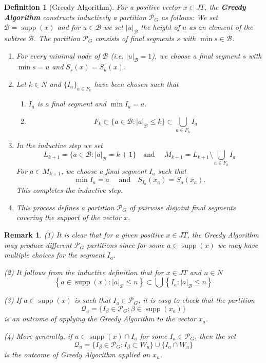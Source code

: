 \documentclass[11pt,a4paper]{amsart}
\newtheorem{definition}[theorem]{Definition}
\newtheorem{remark}[theorem]{Remark}
\newcommand{\JT}{JT}
\newcommand{\supp}{\operatorname{supp}}
\newcommand{\N}{N}
\begin{document}
\begin{definition}[Greedy Algorithm]
    For a positive vector $x \in \JT$, the \textbf{Greedy Algorithm} constructs inductively a partition $\mathcal{P}_G$ as follows:
    We set $\mathcal{B} = \supp(x)$ and for $u \in \mathcal{B}$ we set $|u|_\mathcal{B}$ the height of $u$ as an element of the subtree $\mathcal{B}$. The partition $\mathcal{P}_G$ consists of final segments $s$ with $\min s \in \mathcal{B}$.
    
    
    \begin{enumerate}
        \item For every minimal node of $\mathcal{B}$ (i.e. $|u|_\mathcal{B}= 1 $), we choose a final segment $s$ with 
        $\min s = u $ and $S_s(x) = S_u(x)$.
        \item Let $k\in \N$ and  $\{ I_a \}_{a\in F_k}$  have been chosen such that 
        \begin{enumerate}
        \item  $I_a $ is a final segment and $\min I_a = a $.
        \item 
        \[ F_k \subset \{ a\in \mathcal{B} : |a|_\mathcal{B} \le k \} \subset \bigcup_{a \in F_k } I_a \]
        \end{enumerate}
      \item In the inductive step we set
       \[ L_{k+1}= \{ a\in \mathcal{B}: |a|_\mathcal{B} = k+1 \} \quad \text{and } \quad M_{k+1} = L_{k+1} \setminus
       \bigcup_{a\in F_k} I_a  \]
       For $a \in M_{k+1} $, we choose a final segment $I_a$ such that
        \[ \min I_a = a \quad \text{ and} \quad S_{I_a}(x_a) = S_a(x_a). \]
       This completes the inductive step.
        \item This process defines a partition $\mathcal{P}_G$ of pairwise disjoint final segments covering the support of the vector $x$.
    \end{enumerate}
\end{definition}
\begin{remark} \label{R5.6}(1) It is clear that for a given  positive $x\in \JT$, the Greedy Algorithm may produce different $\mathcal{P}_G$ partitions since for some $a \in \supp(x)$ we may have multiple choices for the segment $I_a$.

(2) It follows from the inductive definition that for $x\in \JT$ and $ n\in \N$ 
\[ \left\{ a\in \supp(x): |a|_\mathcal{B} \le n \right\} \subset \bigcup \left\{ I_a : |a|_\mathcal{B} \le n\right\} \]

(3) If $a\in \supp(x)$ is such that $I_a \in \mathcal{P}_G$, it is easy to check that the partition 
  $$\mathcal{Q}_a = \{ I_\beta \in \mathcal{P}_G: \beta \in \supp(x_a) \} $$ is an outcome of applying the Greedy Algorithm to the vector $x_a$.
 
 (4) More generally, if $u\in \supp(x)\cap I_a$ for some $I_a\in \mathcal{P}_G$, then the set 
  \[ \mathcal{Q}_u = \{ I_\beta \in \mathcal{P}_G : I_\beta \subset W_u  \} \cup \{I_a \cap W_u\} \]
  is the outcome of Greedy Algorithm applied on $x_u$.

 \end{remark}
 
\end{document}
